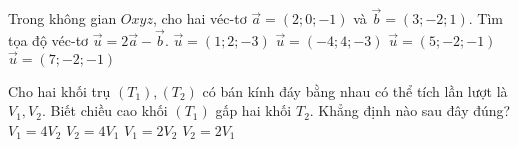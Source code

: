 \begin{ex}%
	Trong không gian $ Oxyz $, cho hai véc-tơ $ \vec{a}=(2;0;-1) $ và $ \vec{b}=(3;-2;1) $. Tìm tọa độ véc-tơ $ \vec{u}=2\vec{a}-\vec{b} $. 
	\choice
	{$\vec{u}=(1;2;-3) $}
	{\True $\vec{u}=(-4;4;-3)$}
	{$\vec{u}=(5;-2;-1)$}
	{$\vec{u}=(7;-2;-1)$}
\end{ex}

\begin{ex}%
	Cho hai khối trụ $ (T_1), (T_2) $ có bán kính đáy bằng nhau có thể tích lần lượt là $ V_1, V_2 $. Biết chiều cao khối $ (T_1) $ gấp hai khối $ T_2 $. Khẳng định nào sau đây đúng?
	\choice
	{$V_1=4V_2$}
	{$V_2=4V_1$}
	{\True $V_1=2V_2$}
	{$V_2=2V_1$}
\end{ex}

